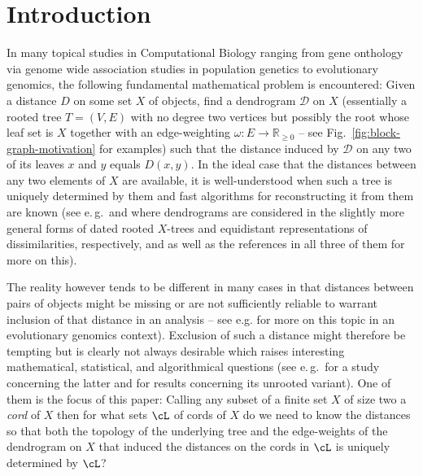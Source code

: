 \section{Introduction}

In many topical studies in Computational Biology ranging from gene onthology
via genome wide association studies in population genetics to evolutionary
genomics, the following fundamental mathematical problem is encountered: Given
a distance $D$ on some set $X$ of objects, find a dendrogram $\mathcal D$ on
$X$ (essentially a rooted tree $T=(V,E)$ with no degree two vertices but
possibly the root whose leaf set is $X$ together with an edge-weighting
$\omega:E\to\mathbb R_{\geq 0}$ -- see Fig.~\ref{fig:block-graph-motivation}
for examples) such that the distance induced by $\mathcal D$ on any two of its
leaves $x$ and $y$ equals $D(x,y)$. In the ideal case that the distances
between any two elements of $X$ are available, it is well-understood when such
a tree is uniquely determined by them and fast algorithms for reconstructing
it from them are known (see e.\,g.\,\cite[Chapter 9.2]{DHKMS11} and
\cite[Chapter 7.2]{semple2003phylogenetics} where dendrograms are considered
in the slightly more general forms of dated rooted $X$-trees and equidistant
representations of dissimilarities, respectively, and \cite[Chapter 3]{BG91}
as well as the references in all three of them for more on this).
 
The reality however tends to be different in many cases in that distances
between pairs of objects might be missing or are not sufficiently reliable to
warrant inclusion of that distance in an analysis -- see
e.g. \cite{P04,SMS10,SS10} for more on this topic in an evolutionary genomics
context).  Exclusion of such a distance might therefore be tempting but is
clearly not always desirable which raises interesting mathematical,
statistical, and algorithmical questions (see
e.\,g.\,\cite{de1984ultrametric,farach1995robust,schader1992mvl} for a study
concerning the latter and
\cite{farach1995robust,guenoche1999approximations,guenoche2004extension,makarenkov2001nouvelle}
for results concerning its unrooted variant).  One of them is the focus of
this paper: Calling any subset of a finite set $X$ of size two a {\em cord} of
$X$ then for what sets $\cL$ of cords of $X$ do we need to know the distances
so that both the topology of the underlying tree and the edge-weights of the
dendrogram on $X$ that induced the distances on the cords in $\cL$ is uniquely
determined by $\cL$?

